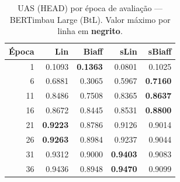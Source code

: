 \clearpage
\begin{table}[p]
\centering
\caption{UAS (HEAD) por \'epoca de avalia\c{c}\~ao --- BERTimbau Large (BtL).
Valor m\'aximo por linha em \textbf{negrito}.}
\label{tab:instab-btl-head}
\begingroup
\small\setlength{\tabcolsep}{10pt}\renewcommand{\arraystretch}{1.2}%
\begin{tabular}{r r r r r}
\toprule
\textbf{\'Epoca} & \textbf{Lin} & \textbf{Biaff} & \textbf{sLin} & \textbf{sBiaff} \\
\midrule
   1 & 0.1093 & \textbf{0.1363} & 0.0801 & 0.1025 \\
   6 & 0.6881 & 0.3065 & 0.5967 & \textbf{0.7160} \\
  11 & 0.8486 & 0.7508 & 0.8365 & \textbf{0.8637} \\
  16 & 0.8672 & 0.8445 & 0.8531 & \textbf{0.8800} \\
  21 & \textbf{0.9223} & 0.8786 & 0.9126 & 0.9014 \\
  26 & \textbf{0.9263} & 0.8984 & 0.9237 & 0.9044 \\
  31 & 0.9312 & 0.9000 & \textbf{0.9403} & 0.9083 \\
  36 & 0.9436 & 0.8948 & \textbf{0.9470} & 0.9099 \\
\bottomrule
\end{tabular}
\endgroup
\instablegendaFull
\end{table}

